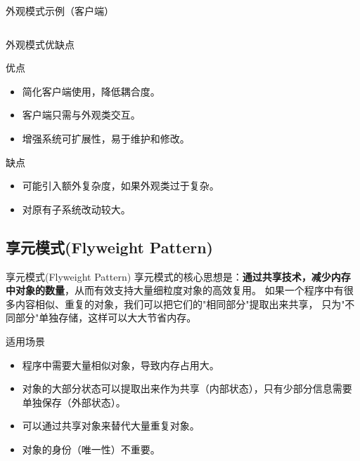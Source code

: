 \documentclass[UTF8,aspectratio=169]{beamer}
\begin{document}
\begin{frame}{外观模式示例（客户端）}
    \inputminted[firstline=72, lastline=82]{cpp}{code/facade_pattern.cpp}
\end{frame}

\begin{frame}{外观模式优缺点}
    \begin{ytublock}{优点}
        \begin{itemize}
            \item 简化客户端使用，降低耦合度。
            \item 客户端只需与外观类交互。
            \item 增强系统可扩展性，易于维护和修改。
        \end{itemize}
    \end{ytublock}
    \begin{alertytublock}{缺点}
        \begin{itemize}
            \item 可能引入额外复杂度，如果外观类过于复杂。
            \item 对原有子系统改动较大。
        \end{itemize}
    \end{alertytublock}
\end{frame}

\subsection{享元模式(Flyweight Pattern)}

\begin{frame}{享元模式(Flyweight Pattern)}
    享元模式的核心思想是：\textbf{通过共享技术，减少内存中对象的数量}，从而有效支持大量细粒度对象的高效复用。
    如果一个程序中有很多内容相似、重复的对象，我们可以把它们的"相同部分"提取出来共享，
    只为"不同部分"单独存储，这样可以大大节省内存。
    \begin{ytublock}{适用场景}
        \begin{itemize}
            \item 程序中需要大量相似对象，导致内存占用大。
            \item 对象的大部分状态可以提取出来作为共享（内部状态），只有少部分信息需要单独保存（外部状态）。
            \item 可以通过共享对象来替代大量重复对象。
            \item 对象的身份（唯一性）不重要。
        \end{itemize}
    \end{ytublock}
\end{frame}
\end{document}
